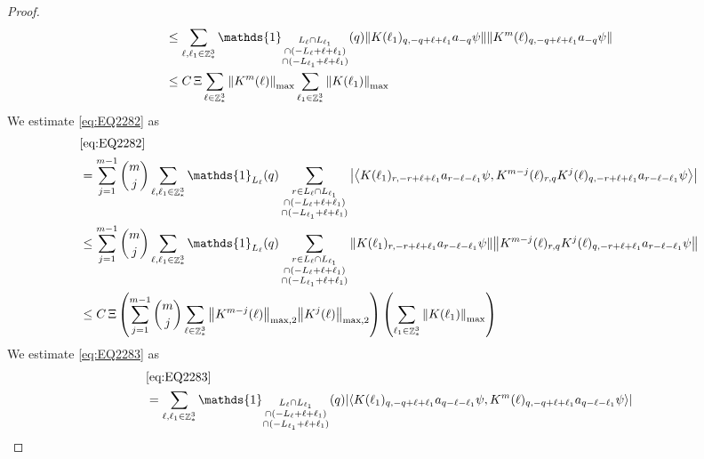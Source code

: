 \documentclass[sn-mathphys, Numbered ,a4paper]{sn-jnl}%
\DeclareMathOperator{\Z}{\mathbb{Z}}
\newcommand{\eva}[1]{\left\langle #1 \right\rangle}
\theoremstyle{plain}
\theoremstyle{definition}
\theoremstyle{remark}
\theoremstyle{plain}
\theoremstyle{definition}
\theoremstyle{remark}
\begin{document}
{\begin{proof}
\begin{align}
	&\leq \sum\limits_{\ell, \ell_1\in \Z^3_*} \mathds{1}_{\substack{L_{\ell}\cap L_{\ell_1}\\\cap (-L_{\ell}+\ell+\ell_1) \\ \cap (-L_{\ell_1}+\ell+\ell_1)}}(q) \norm{ K(\ell_1)_{q,-q+\ell+\ell_1} a_{-q} \psi}\norm{ K^m(\ell)_{q,-q+\ell+\ell_1} a_{-q} \psi }\nonumber\\
	&\leq C\,\Xi\sum\limits_{\ell \in \Z^3_*} \norm{K^m(\ell)}_{\mathrm{max}} \sum\limits_{\ell_1 \in \Z^3_*} \norm{K(\ell_1)}_{\mathrm{max}}  \label{eq:estEQ2281}
\end{align}
We estimate \eqref{eq:EQ2282} as
\begin{align}
	& \eqref{eq:EQ2282}\nonumber\\
	&= \sum\limits_{j=1}^{m-1} {{m}\choose j} \sum\limits_{\ell, \ell_1\in \Z^3_*}\mathds{1}_{L_{\ell}}(q) \sum\limits_{\substack{r\in L_{\ell} \cap L_{\ell_1}\\\cap (-L_{\ell}+\ell+\ell_1) \\ \cap (-L_{\ell_1}+\ell+\ell_1)}}  \abs{\eva{ K(\ell_1)_{r,-r+\ell+\ell_1} a_{r-\ell-\ell_1} \psi, K^{m-j}(\ell)_{r,q} K^j(\ell)_{q,-r+\ell+\ell_1} a_{r-\ell-\ell_1} \psi }}\nonumber\\
	&\leq \sum\limits_{j=1}^{m-1} {{m}\choose j} \sum\limits_{\ell, \ell_1\in \Z^3_*}\mathds{1}_{L_{\ell}}(q) \sum\limits_{\substack{r\in L_{\ell} \cap L_{\ell_1}\\\cap (-L_{\ell}+\ell+\ell_1) \\ \cap (-L_{\ell_1}+\ell+\ell_1)}}  \norm{ K(\ell_1)_{r,-r+\ell+\ell_1} a_{r-\ell-\ell_1} \psi} \norm{ K^{m-j}(\ell)_{r,q} K^j(\ell)_{q,-r+\ell+\ell_1} a_{r-\ell-\ell_1} \psi} \nonumber\\
	&\leq C\,\Xi \left(\sum\limits_{j=1}^{m-1} {{m}\choose j} \sum\limits_{ \ell\in \Z^3_*} \norm{K^{m-j}(\ell)}_{\mathrm{max,2}} \norm{K^j(\ell)}_{\mathrm{max,2}}\right) \left(\sum\limits_{ \ell_1\in \Z^3_*}\norm{ K(\ell_1)}_{\mathrm{max}} \right)\label{eq:estEQ2282}
\end{align}
We estimate \eqref{eq:EQ2283} as
\begin{align}
	& \eqref{eq:EQ2283}\nonumber\\
	&= \sum\limits_{\ell, \ell_1\in \Z^3_*} \mathds{1}_{\substack{L_{\ell}\cap L_{\ell_1}\\\cap (-L_{\ell}+\ell+\ell_1) \\ \cap (-L_{\ell_1}+\ell+\ell_1)}} (q) \abs{\eva{K(\ell_1)_{q,-q+\ell+\ell_1} a_{q-\ell-\ell_1} \psi, K^m(\ell)_{q,-q+\ell+\ell_1} a_{q-\ell-\ell_1}\psi }}\nonumber\\

\end{align}
\end{proof}}
\end{document}
